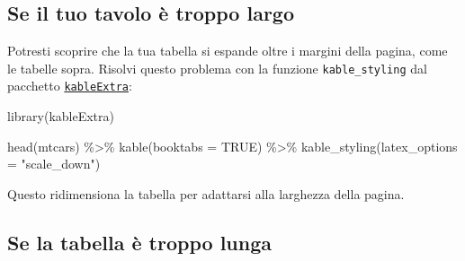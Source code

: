 \documentclass[a4paper, 11pt, nobind]{templates/ociamthesis}
\newenvironment{Shaded}{\begin{snugshade}}{\end{snugshade}}
\newcommand{\AttributeTok}[1]{\textcolor[rgb]{0.77,0.63,0.00}{#1}}
\newcommand{\ConstantTok}[1]{\textcolor[rgb]{0.00,0.00,0.00}{#1}}
\newcommand{\FunctionTok}[1]{\textcolor[rgb]{0.00,0.00,0.00}{#1}}
\newcommand{\NormalTok}[1]{#1}
\newcommand{\SpecialCharTok}[1]{\textcolor[rgb]{0.00,0.00,0.00}{#1}}
\newcommand{\StringTok}[1]{\textcolor[rgb]{0.31,0.60,0.02}{#1}}
\renewenvironment{Shaded}
{
  \vspace{10pt}%
  \begin{snugshade}%
}{%
  \end{snugshade}%
  \vspace{8pt}%
}
\begin{document}
\hypertarget{se-il-tuo-tavolo-uxe8-troppo-largo}{%
\subsection{Se il tuo tavolo è troppo largo}\label{se-il-tuo-tavolo-uxe8-troppo-largo}}

Potresti scoprire che la tua tabella si espande oltre i margini della pagina, come le tabelle sopra.
Risolvi questo problema con la funzione \texttt{kable\_styling} dal pacchetto \href{https://haozhu233.github.io/kableExtra/}{\texttt{kableExtra}}:

\begin{Shaded}
\begin{Highlighting}[]
\FunctionTok{library}\NormalTok{(kableExtra)}

\FunctionTok{head}\NormalTok{(mtcars) }\SpecialCharTok{\%\textgreater{}\%} 
  \FunctionTok{kable}\NormalTok{(}\AttributeTok{booktabs =} \ConstantTok{TRUE}\NormalTok{) }\SpecialCharTok{\%\textgreater{}\%} 
  \FunctionTok{kable\_styling}\NormalTok{(}\AttributeTok{latex\_options =} \StringTok{"scale\_down"}\NormalTok{)}
\end{Highlighting}
\end{Shaded}

\begin{table}
\centering
{}
\end{table}

Questo ridimensiona la tabella per adattarsi alla larghezza della pagina.

\hypertarget{se-la-tabella-uxe8-troppo-lunga}{%
\subsection{Se la tabella è troppo lunga}\label{se-la-tabella-uxe8-troppo-lunga}}
\end{document}
